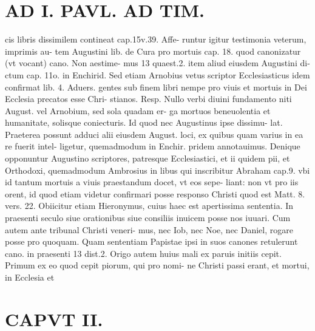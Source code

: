 \documentclass{article}
\begin{document}
\begin{pages}
\section*{AD I. PAVL. AD TIM. }
\marginpar{[ p.46 ]}\pstart cis libris dissimilem contineat cap.15v.39. Affe- runtur igitur testimonia veterum, imprimis au- tem Augustini lib.  de Cura pro mortuis cap. 18. quod canonizatur (vt vocant) cano. Non aestime- mus 13 quaest.2. item aliud eiusdem Augustini di- ctum cap. 11o. in Enchirid. Sed etiam Arnobius vetus scriptor Ecclesiasticus idem confirmat lib.  4. Aduers. gentes sub finem libri nempe pro viuis et mortuis in Dei Ecclesia precatos esse Chri- stianos. Resp. Nullo verbi diuini fundamento niti August. vel Arnobium, sed sola quadam er- ga mortuos beneuolentia et humanitate, solisque coniecturis. Id quod nec Augustinus ipse dissimu- lat. Praeterea possunt adduci alii eiusdem August. loci, ex quibus quam varius in ea re fuerit intel- ligetur, quemadmodum in Enchir. pridem annotauimus. Denique opponuntur Augustino scriptores, patresque Ecclesiastici, et ii quidem pii, et Orthodoxi, quemadmodum Ambrosius in libus  qui inscribitur Abraham cap.9. vbi id tantum mortuis a viuis praestandum docet, vt eos sepe- liant: non vt pro iis orent, id quod etiam videtur confirmari posse responso Christi quod est Matt. 8. vers. 22. Obiicitur etiam Hieronymus, cuius haec est apertissima sententia. In praesenti seculo siue orationibus siue consiliis inuicem posse nos iuuari. Cum autem ante tribunal Christi veneri- mus, nec Iob, nec Noe, nec Daniel, rogare posse pro quoquam. Quam sententiam Papistae ipsi in suos canones retulerunt cano. in praesenti 13 dist.2. Origo autem huius mali ex paruis initiis cepit. Primum ex eo quod cepit piorum, qui pro nomi- ne Christi passi erant, et mortui, in Ecclesia et  \pend
\section*{CAPVT  II. }
\marginpar{[ p.47 ]}\pstart {}
{}

\end{pages}
\end{document}
